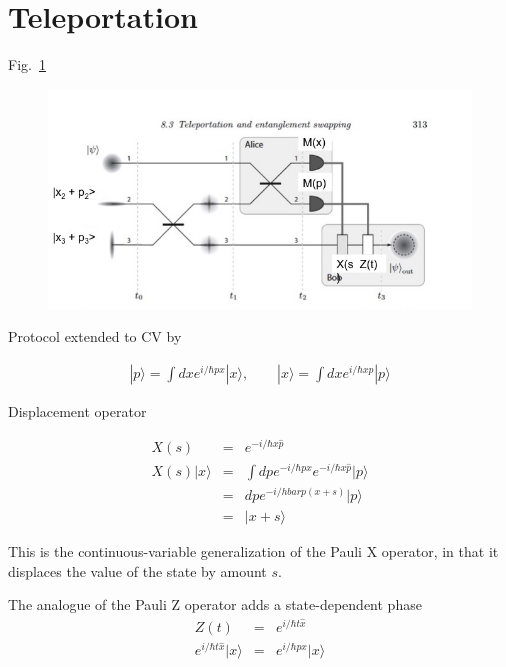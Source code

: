 \documentclass[pra,
superscriptaddress,
 amsmath,amssymb,
 aps,twocolumn]{revtex4-1}
\newcommand{\ket}[1]{|{#1}\rangle}
\begin{document}
\section{Teleportation}
Fig.~\ref{fig:tele}
\begin{widetext}
\begin{figure}[h!]
\includegraphics[trim = 0cm 0cm 0cm 0cm, clip, width=1.6\linewidth]{teleport.jpg}
\caption{\label{fig:tele}}
\end{figure} 


\end{widetext}


Protocol extended to CV by \cite{bib:PhysRevA.49.1473, bib:PhysRevLett.80.869}

\cite{bib:kok2010introduction}
\begin{align}
\ket{p} = \int dx e^{i/\hbar p x} \ket{x}, \qquad 
\ket{x} = \int dx e^{i/\hbar x p} \ket{p}
\end{align}

Displacement operator


\begin{eqnarray}
X(s) &=& e^{-i/\hbar x \hat p}\\
X(s)\ket{x} &=&  \int dp e^{-i/\hbar p x} e^{-i/\hbar x \hat p} \ket{p} \\
   			&=& dp e^{-i/hbar p(x+s)} \ket{p} \\
   			&=&\ket{x+s}
\end{eqnarray}

This is the continuous-variable generalization of the Pauli X operator, in that it displaces the value of the state by amount $s$.


The analogue of the Pauli Z operator adds a state-dependent phase
% 
\begin{eqnarray}
Z(t ) &=& e^{i/\hbar t \hat x} \\
 e^{i/\hbar t \hat x} \ket{x} &=& e^{i/\hbar p x} \ket{x}
\end{eqnarray}
\end{document}
